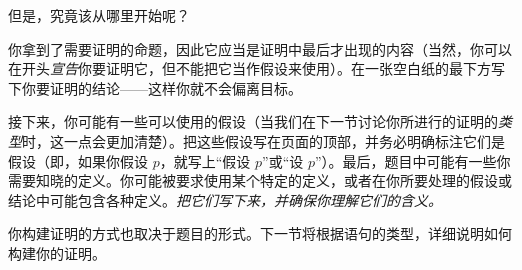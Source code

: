 \documentclass[../../../include/open-logic-section]{subfiles}
\begin{document}


但是，究竟该从哪里开始呢？

你拿到了需要证明的命题，因此它应当是证明中最后才出现的内容（当然，你可以在开头\emph{宣告}你要证明它，但不能把它当作假设来使用）。在一张空白纸的最下方写下你要证明的结论——这样你就不会偏离目标。

接下来，你可能有一些可以使用的假设（当我们在下一节讨论你所进行的证明的\emph{类型}时，这一点会更加清楚）。把这些假设写在页面的顶部，并务必明确标注它们是假设（即，如果你假设 $p$，就写上“假设 $p$”或“设 $p$”）。最后，题目中可能有一些你需要知晓的定义。你可能被要求使用某个特定的定义，或者在你所要处理的假设或结论中可能包含各种定义。\emph{把它们写下来，并确保你理解它们的含义。}

你构建证明的方式也取决于题目的形式。下一节将根据语句的类型，详细说明如何构建你的证明。
\end{document}
